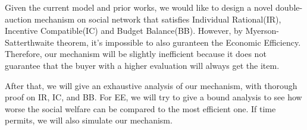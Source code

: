 Given the current model and prior works, we would like to design a novel double-auction mechanism
on social network that satisfies Individual Rational(IR), Incentive Compatible(IC) and Budget Balance(BB).
However, by Myerson-Satterthwaite theorem\cite{MYERSON1983265}, it's impossible to also guranteen the
Economic Efficiency. Therefore, our mechanism will be slightly inefficient because it does not
guarantee that the buyer with a higher evaluation will always get the item.\par
After that, we will give an exhaustive analysis of our mechanism, with thorough proof on
IR, IC, and BB. For EE, we will try to give a bound analysis to see how worse the social welfare
can be compared to the most efficient one. If time permits, we will also simulate our mechanism.
